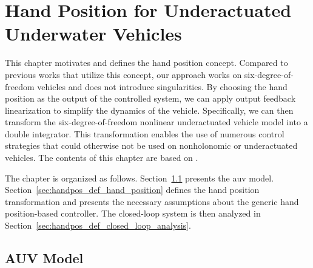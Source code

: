 \chapter{Hand Position for Underactuated Underwater Vehicles}
\label{chap:handpos_definition}

\newcommand{\LBomega}{\Bar{p}}
\newcommand{\LBnu}{\Bar{\bvel}_e}

This chapter motivates and defines the hand position concept.
Compared to previous works that utilize this concept, our approach works on six-degree-of-freedom vehicles and does not introduce singularities.
By choosing the hand position as the output of the controlled system, we can apply output feedback linearization to simplify the dynamics of the vehicle.
Specifically, we can then transform the six-degree-of-freedom nonlinear underactuated vehicle model into a double integrator.
This transformation enables the use of numerous control strategies that could otherwise not be used on nonholonomic or underactuated vehicles.
The contents of this chapter are based on \cite{matous_trajectory_2023}.

The chapter is organized as follows.
Section~\ref{sec:handpos_def_model} presents the \gls{auv} model.
Section~\ref{sec:handpos_def_hand_position} defines the hand position transformation and presents the necessary assumptions about the generic hand position-based controller.
The closed-loop system is then analyzed in Section~\ref{sec:handpos_def_closed_loop_analysis}.

\section{AUV Model}
\label{sec:handpos_def_model}

